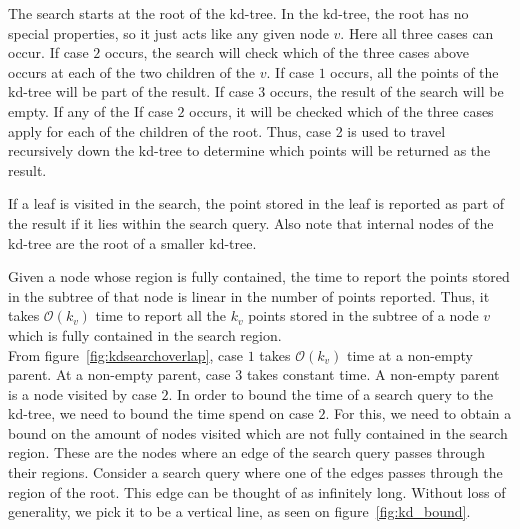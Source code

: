 The search starts at the root of the kd-tree. In the kd-tree, the root has no special properties, so it just acts like any given node $v$. Here all three cases can occur. If case $2$ occurs, the search will check which of the three cases above occurs at each of the two children of the $v$. If case $1$ occurs, all the points of the kd-tree will be part of the result. If case $3$ occurs, the result of the search will be empty. If any of the If case $2$ occurs, it will be checked which of the three cases apply for each of the children of the root. Thus, case 2 is used to travel recursively down the kd-tree to determine which points will be returned as the result.

\noindent If a leaf is visited in the search, the point stored in the leaf is reported as part of the result if it lies within the search query. Also note that internal nodes of the kd-tree are the root of a smaller kd-tree.

Given a node whose region is fully contained, the time to report the points stored in the subtree of that node is linear in the number of points reported. Thus, it takes $\mathcal{O}(k_v)$ time to report all the $k_v$ points stored in the subtree of a node $v$ which is fully contained in the search region. \\

From figure~\ref{fig:kdsearchoverlap}, case $1$ takes $\mathcal{O}(k_v)$ time at a non-empty parent. At a non-empty parent, case $3$ takes constant time. A non-empty parent is a node visited by case $2$. In order to bound the time of a search query to the kd-tree, we need to bound the time spend on case $2$. For this, we need to obtain a bound on the amount of nodes visited which are not fully contained in the search region. These are the nodes where an edge of the search query passes through their regions. Consider a search query where one of the edges passes through the region of the root. This edge can be thought of as infinitely long. Without loss of generality, we pick it to be a vertical line, as seen on figure~\ref{fig:kd_bound}. \\


